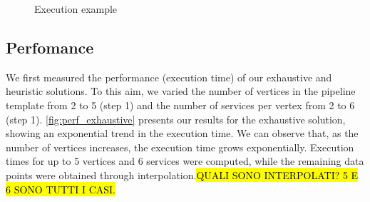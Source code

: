 \begin{figure}[!t]
{
  }
  \caption{Execution example}
  \label{fig:execution_example}
\end{figure}

\subsection{Perfomance}\label{subsec:experiments_performance}
We first measured the performance (execution time) of our exhaustive and heuristic solutions. To this aim, we varied the number of vertices in the pipeline template from 2 to 5 (step 1) and the number of services per vertex from 2 to 6 (step 1). \cref{fig:perf_exhaustive} presents our results for the exhaustive solution, showing an exponential trend in the execution time. We can observe that, as the number of vertices increases, the execution time grows exponentially. Execution times for up to 5 vertices and 6 services were computed, while the remaining data points were obtained through interpolation.\hl{QUALI SONO INTERPOLATI? 5 E 6 SONO TUTTI I CASI.}

